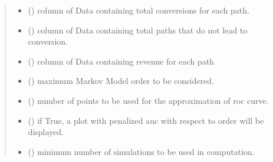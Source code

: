 \documentclass[letterpaper,10pt,english]{sphinxmanual}
\begin{document}
\begin{fulllineitems}
\begin{quote}
\begin{description}
\begin{itemize}
\item {} 
\sphinxAtStartPar
{} () \textendash{} column of Data containing total conversions for each path.

\item {} 
\sphinxAtStartPar
{} () \textendash{} column of Data containing total paths that do not lead to conversion.

\item {} 
\sphinxAtStartPar
{} (\sphinxstyleliteralemphasis{\sphinxupquote{, }}\sphinxstyleliteralemphasis{\sphinxupquote{, }}) \textendash{} column of Data containing revenue for each path

\item {} 
\sphinxAtStartPar
{} (\sphinxstyleliteralemphasis{\sphinxupquote{, }}) \textendash{} maximum Markov Model order to be considered.

\item {} 
\sphinxAtStartPar
{} (\sphinxstyleliteralemphasis{\sphinxupquote{, }}) \textendash{} number of points to be used for the approximation of roc curve.

\item {} 
\sphinxAtStartPar
{} (\sphinxstyleliteralemphasis{\sphinxupquote{, }}) \textendash{} if True, a plot with penalized auc with respect to order will be displayed.

\item {} 
\sphinxAtStartPar
{} (\sphinxstyleliteralemphasis{\sphinxupquote{, }}) \textendash{} minimum number of simulations to be used in computation.


\end{itemize}
\end{description}
\end{quote}
\end{fulllineitems}
\end{document}
